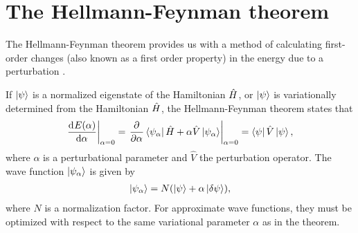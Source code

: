     \section{The Hellmann-Feynman theorem}
        The Hellmann-Feynman theorem provides us with a method of calculating
        first-order changes (also known as a first order property) in the energy
        due to a perturbation \cite{helgaker-molecular}.
        \begin{theorem}
            If $\ket{\psi}$ is a normalized eigenstate of the Hamiltonian
            $\hat{H}$, or $\ket{\psi}$ is variationally determined from the
            Hamiltonian $\hat{H}$, the Hellmann-Feynman theorem \cite{feynman}
            states that
            \begin{align}
                \left.\dod[]{E(\alpha)}{\alpha}\right\rvert_{\alpha = 0}
                =
                \left.
                \dpd[]{}{\alpha}
                \bra{\psi_{\alpha}}\hamil + \alpha\hat{V}\ket{\psi_{\alpha}}
                \right\rvert_{\alpha = 0}
                = \bra{\psi}\hat{V}\ket{\psi},
                \label{eq:hellmann-feynman}
            \end{align}
            where $\alpha$ is a perturbational parameter and $\hat{V}$ the
            perturbation operator.
            The wave function $\ket{\psi_{\alpha}}$ is given by
            \begin{align}
                \ket{\psi_{\alpha}} = N(\ket{\psi} + \alpha\ket{\delta\psi}),
            \end{align}
            where $N$ is a normalization factor.
            For approximate wave functions, they must be optimized with respect
            to the same variational parameter $\alpha$ as in the theorem.
        \end{theorem}
